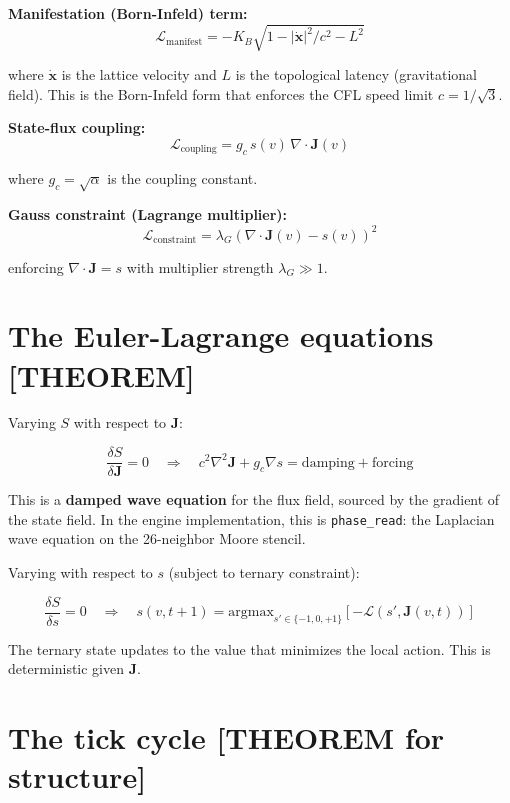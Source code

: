 \documentclass[
  11pt,
  letterpaper,
  twoside,
  openany]{book}
\makeatletter
\let\orig@section\section
\renewcommand{\section}{\needspace{8\baselineskip}\orig@section}
\makeatother
\begin{document}
\textbf{Manifestation (Born-Infeld) term:} \[
\mathcal{L}_{\text{manifest}} = -K_B \sqrt{1 - |\dot{\mathbf{x}}|^2/c^2 - L^2}
\tag{14.3}
\]

where \(\dot{\mathbf{x}}\) is the lattice velocity and \(L\) is the
topological latency (gravitational field). This is the Born-Infeld form
that enforces the CFL speed limit \(c = 1/\sqrt{3}\).

\textbf{State-flux coupling:} \[
\mathcal{L}_{\text{coupling}} = g_c \, s(v) \, \nabla \cdot \mathbf{J}(v)
\tag{14.4}
\]

where \(g_c = \sqrt{\alpha}\) is the coupling constant.

\textbf{Gauss constraint (Lagrange multiplier):} \[
\mathcal{L}_{\text{constraint}} = \lambda_G \left( \nabla \cdot \mathbf{J}(v) - s(v) \right)^2
\tag{14.5}
\]

enforcing \(\nabla \cdot \mathbf{J} = s\) with multiplier strength
\(\lambda_G \gg 1\).

\section{The Euler-Lagrange equations
{[}THEOREM{]}}\label{the-euler-lagrange-equations-theorem}

Varying \(S\) with respect to \(\mathbf{J}\):

\[
\frac{\delta S}{\delta \mathbf{J}} = 0 \quad \Longrightarrow \quad c^2 \nabla^2 \mathbf{J} + g_c \nabla s = \text{damping} + \text{forcing}
\tag{14.6}
\]

This is a \textbf{damped wave equation} for the flux field, sourced by
the gradient of the state field. In the engine implementation, this is
\texttt{phase\_read}: the Laplacian wave equation on the 26-neighbor
Moore stencil.

Varying with respect to \(s\) (subject to ternary constraint):

\[
\frac{\delta S}{\delta s} = 0 \quad \Longrightarrow \quad s(v, t+1) = \text{argmax}_{s' \in \{-1,0,+1\}} \left[ -\mathcal{L}(s', \mathbf{J}(v,t)) \right]
\tag{14.7}
\]

The ternary state updates to the value that minimizes the local action.
This is deterministic given \(\mathbf{J}\).

\section{The tick cycle {[}THEOREM for
structure{]}}\label{the-tick-cycle-theorem-for-structure}
\end{document}

